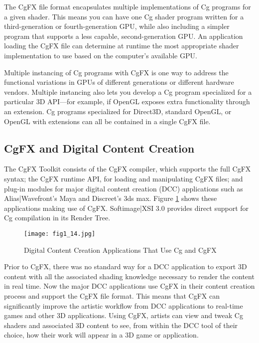 \documentclass[../main.tex]{subfiles}
\begin{document}
The CgFX file format encapsulates multiple implementations of Cg programs for a given shader. This means you can have one Cg shader program written for a third-generation or fourth-generation GPU, while also including a simpler program that supports a less capable, second-generation GPU. An application loading the CgFX file can determine at runtime the most appropriate shader implementation to use based on the computer's available GPU.

Multiple instancing of Cg programs with CgFX is one way to address the functional variations in GPUs of different generations or different hardware vendors. Multiple instancing also lets you develop a Cg program specialized for a particular 3D API—for example, if OpenGL exposes extra functionality through an extension. Cg programs specialized for Direct3D, standard OpenGL, or OpenGL with extensions can all be contained in a single CgFX file.

\subsection*{CgFX and Digital Content Creation}

The CgFX Toolkit consists of the CgFX compiler, which supports the full CgFX syntax; the CgFX runtime API, for loading and manipulating CgFX files; and plug-in modules for major digital content creation (DCC) applications such as Alias|Wavefront's Maya and Discreet's 3ds max. Figure \ref{fig:1-14} shows these applications making use of CgFX. Softimage|XSI 3.0 provides direct support for Cg compilation in its Render Tree.

\begin{figure}
    \centering
    \texttt{[image: fig1\_14.jpg]}
    \caption{Digital Content Creation Applications That Use Cg and CgFX}
    \label{fig:1-14}
\end{figure}

Prior to CgFX, there was no standard way for a DCC application to export 3D content with all the associated shading knowledge necessary to render the content in real time. Now the major DCC applications use CgFX in their content creation process and support the CgFX file format. This means that CgFX can significantly improve the artistic workflow from DCC applications to real-time games and other 3D applications. Using CgFX, artists can view and tweak Cg shaders and associated 3D content to see, from within the DCC tool of their choice, how their work will appear in a 3D game or application.
\end{document}
